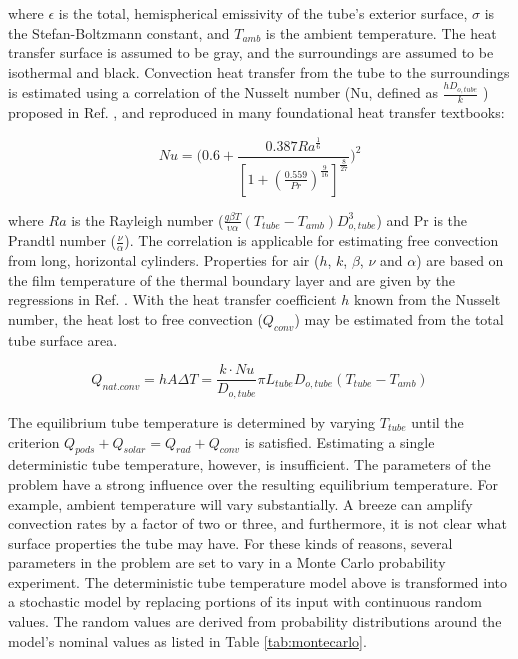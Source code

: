 \documentclass[heading.tex]{subfiles}
\begin{document}
where $\epsilon$ is the total, hemispherical emissivity of the tube’s exterior surface,
$\sigma$ is the Stefan-Boltzmann constant, and $T_{amb}$ is the ambient temperature.
The heat transfer surface is assumed to be gray,
and the surroundings are assumed to be isothermal and black.
Convection heat transfer from the tube to the surroundings is estimated using a
correlation of the Nusselt number (Nu, defined as $\frac{hD_{o,tube}}{k}$ )
proposed in Ref. \cite{Churchill}, and reproduced in many foundational heat transfer textbooks:


\begin{equation}
Nu = \Bigg(0.6 + \frac{0.387Ra^{\frac{1}{6}}}{[1+(\frac{0.559}{Pr})^{\frac{9}{16}}]^{\frac{8}{27}}}\Bigg)^2
\end{equation}

where $Ra$ is the Rayleigh number
($\frac{g \beta T} {\upsilon\alpha}  (T_{tube}-T_{amb}) {D}_{o,tube}^3$)
and Pr is the Prandtl number ($\frac{\nu}{\alpha}$).
The correlation is applicable for estimating free convection from long,
horizontal cylinders. Properties for air ($h$, $k$, $\beta$, $\nu$ and $\alpha$)
are based on the film temperature of the thermal boundary layer
and are given by the regressions in Ref. \cite{Clausing}.
With the heat transfer coefficient $h$ known from the Nusselt number,
the heat lost to free convection ($Q_{conv}$) may be estimated from the total tube surface area.

\begin{equation}
Q_{nat. conv} = hA \Delta T = \frac{k\cdot Nu}{ {D}_{o,tube}} \pi {L}_{tube} {D}_{o,tube} (T_{tube}-T_{amb})
\end{equation}


The equilibrium tube temperature is determined by varying $T_{tube}$ until the criterion
$Q_{pods} + Q_{solar} = Q_{rad} + Q_{conv}$ is satisfied.
Estimating a single deterministic tube temperature, however, is insufficient.
The parameters of the problem have a strong influence over the resulting equilibrium
temperature. For example, ambient temperature will vary substantially.
A breeze can amplify convection rates by a factor of two or three,
and furthermore,
it is not clear what surface properties the tube may have.
For these kinds of reasons, several parameters in the problem are set to vary in 
a Monte Carlo probability experiment.
The deterministic tube temperature model above is transformed into a stochastic model by
replacing portions of its input with continuous random values.
The random values are derived from probability distributions
around the model’s nominal values as listed in Table \ref{tab:montecarlo}.
\end{document}
